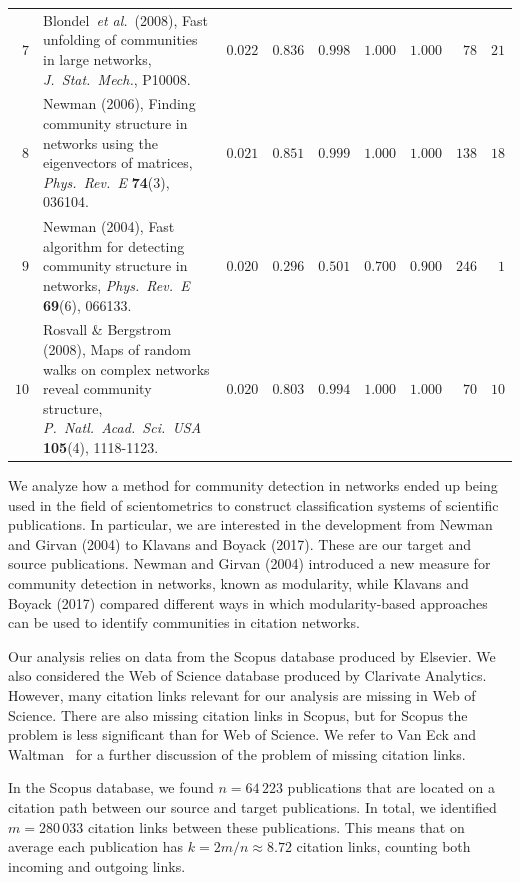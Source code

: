 \documentclass[9pt,twocolumn,twoside]{pnas-alt} %
\theoremstyle{definition}
\renewcommand{\etal}{~\emph{et al.}\xspace}
\begin{document}
\begin{sansmath}
\begin{table}[b!]
\begin{tabular}{rp{9.75cm}rrrrrrr}
    $7$ & Blondel\etal~(2008), Fast unfolding of communities in large networks, \textit{J.\ Stat.\ Mech.}, P10008. & $0.022$ & $0.836$ & $0.998$ & $1.000$ & $1.000$ & $78$ & $21$ \\
    $8$ & Newman (2006), Finding community structure in networks using the eigenvectors of matrices, \textit{Phys.\ Rev.\ E} \textbf{74}(3), 036104. & $0.021$ & $0.851$ & $0.999$ & $1.000$ & $1.000$ & $138$ & $18$ \\
    $9$ & Newman (2004), Fast algorithm for detecting community structure in networks, \textit{Phys.\ Rev.\ E} \textbf{69}(6), 066133. & $0.020$ & $0.296$ & $0.501$ & $0.700$ & $0.900$ & $246$ & $1$ \\
    $10$ & Rosvall \& Bergstrom (2008), Maps of random walks on complex networks reveal community structure, \textit{P.\ Natl.\ Acad.\ Sci.\ USA} \textbf{105}(4), 1118-1123. & $0.020$ & $0.803$ & $0.994$ & $1.000$ & $1.000$ & $70$ & $10$ \\\bottomrule
  \end{tabular}
  \label{tbl:Q}
\end{table}\end{sansmath}

We analyze how a method for community detection in networks ended up being used in the field of scientometrics to construct classification systems of scientific publications. In particular, we are interested in the development from Newman and Girvan (2004) to Klavans and Boyack (2017). These are our target and source publications. Newman and Girvan (2004) introduced a new measure for community detection in networks, known as modularity, while Klavans and Boyack (2017) compared different ways in which modularity-based approaches can be used to identify communities in citation networks.

Our analysis relies on data from the Scopus database produced by Elsevier. We also considered the Web of Science database produced by Clarivate Analytics. However, many citation links relevant for our analysis are missing in Web of Science. There are also missing citation links in Scopus, but for Scopus the problem is less significant than for Web of Science. We refer to Van Eck and Waltman~\cite{VanEck2017} for a further discussion of the problem of missing citation links.

In the Scopus database, we found $n = 64\,223$ publications that are located on a citation path between our source and target publications. In total, we identified $m = 280\,033$ citation links between these publications. This means that on average each publication has $k = 2m / n \approx 8.72$ citation links, counting both incoming and outgoing links.
\end{document}
